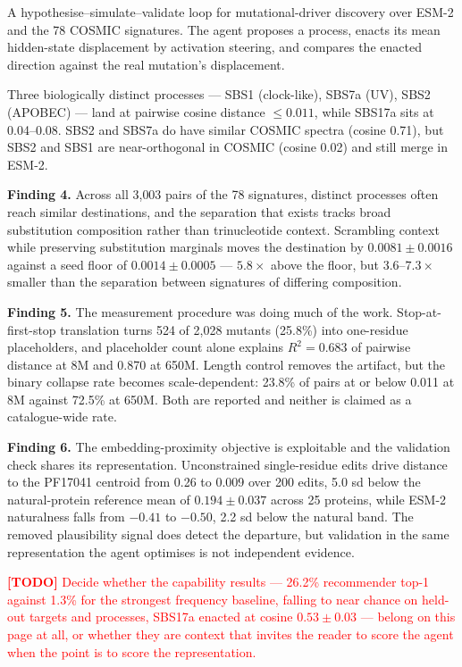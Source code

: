 \documentclass[11pt]{article}
\newcommand{\todo}[1]{\par\medskip\noindent\textcolor{red}{\textbf{[TODO]} #1}\par\medskip}
\newcommand{\finding}[2]{\par\medskip\noindent\textbf{Finding #1.} #2\par\medskip}
\begin{document}
A hypothesise--simulate--validate loop for mutational-driver discovery over ESM-2 and the 78 COSMIC signatures.
The agent proposes a process, enacts its mean hidden-state displacement by activation steering, and compares
the enacted direction against the real mutation's displacement.

Three biologically distinct processes --- SBS1 (clock-like), SBS7a (UV), SBS2 (APOBEC) --- land at pairwise
cosine distance $\leq 0.011$, while SBS17a sits at 0.04--0.08. SBS2 and SBS7a do have similar COSMIC spectra
(cosine 0.71), but SBS2 and SBS1 are near-orthogonal in COSMIC (cosine 0.02) and still merge in ESM-2.

\finding{4}{Across all 3{,}003 pairs of the 78 signatures, distinct processes often reach similar destinations,
and the separation that exists tracks broad substitution composition rather than trinucleotide context.
Scrambling context while preserving substitution marginals moves the destination by $0.0081 \pm 0.0016$ against
a seed floor of $0.0014 \pm 0.0005$ --- $5.8\times$ above the floor, but 3.6--$7.3\times$ smaller than the
separation between signatures of differing composition.}

\finding{5}{The measurement procedure was doing much of the work. Stop-at-first-stop translation turns 524 of
2{,}028 mutants (25.8\%) into one-residue placeholders, and placeholder count alone explains $R^2 = 0.683$ of
pairwise distance at 8M and 0.870 at 650M. Length control removes the artifact, but the binary collapse rate
becomes scale-dependent: 23.8\% of pairs at or below 0.011 at 8M against 72.5\% at 650M. Both are reported and
neither is claimed as a catalogue-wide rate.}

\finding{6}{The embedding-proximity objective is exploitable and the validation check shares its
representation. Unconstrained single-residue edits drive distance to the PF17041 centroid from 0.26 to 0.009
over 200 edits, 5.0 sd below the natural-protein reference mean of $0.194 \pm 0.037$ across 25 proteins, while ESM-2
naturalness falls from $-0.41$ to $-0.50$, 2.2 sd below the natural band. The removed plausibility signal does
detect the departure, but validation in the same representation the agent optimises is not independent
evidence.}

\todo{Decide whether the capability results --- 26.2\% recommender top-1 against 1.3\% for the strongest
frequency baseline, falling to near chance on held-out targets and processes, SBS17a enacted at cosine
$0.53 \pm 0.03$ --- belong on this page at all, or whether they are context that invites the reader to score
the agent when the point is to score the representation.}
\end{document}
